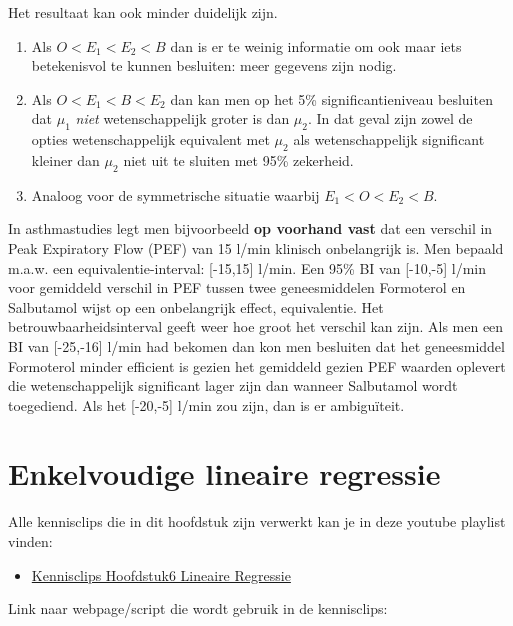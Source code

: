 \documentclass[
  12pt,dutch,coursenotes]{book}
\providecommand{\tightlist}{%
  \setlength{\itemsep}{0pt}\setlength{\parskip}{0pt}}
\theoremstyle{definition}
\theoremstyle{definition}
\theoremstyle{definition}
\theoremstyle{definition}
\theoremstyle{remark}
\begin{document}
Het resultaat kan ook minder duidelijk zijn.

\begin{enumerate}
\def\labelenumi{\arabic{enumi}.}
\tightlist
\item
  Als \(O < E_1 < E_2 < B\) dan is er te weinig informatie om ook maar iets betekenisvol te kunnen besluiten: meer gegevens zijn nodig.
\item
  Als \(O < E_1 < B < E_2\) dan kan men op het 5\% significantieniveau besluiten dat \(\mu_1\) \emph{niet} wetenschappelijk groter is dan \(\mu_2\). In dat geval zijn zowel de opties wetenschappelijk equivalent met \(\mu_2\) als wetenschappelijk significant kleiner dan \(\mu_2\) niet uit te sluiten met 95\% zekerheid.
\item
  Analoog voor de symmetrische situatie waarbij \(E_1 < O < E_2 < B.\)
\end{enumerate}

In asthmastudies legt men bijvoorbeeld \textbf{op voorhand vast} dat een verschil in Peak Expiratory Flow (PEF) van 15 l/min klinisch onbelangrijk is. Men bepaald m.a.w. een equivalentie-interval: {[}-15,15{]} l/min. Een 95\% BI van {[}-10,-5{]} l/min voor gemiddeld verschil in PEF tussen twee geneesmiddelen Formoterol en Salbutamol wijst op een onbelangrijk effect, equivalentie. Het betrouwbaarheidsinterval geeft weer hoe groot het verschil kan zijn.
Als men een BI van {[}-25,-16{]} l/min had bekomen dan kon men besluiten dat het geneesmiddel Formoterol minder efficient is gezien het gemiddeld gezien PEF waarden oplevert die wetenschappelijk significant lager zijn dan wanneer Salbutamol wordt toegediend. Als het {[}-20,-5{]} l/min zou zijn, dan is er ambiguïteit.

\hypertarget{chap-linReg}{%
\chapter{Enkelvoudige lineaire regressie}\label{chap-linReg}}

Alle kennisclips die in dit hoofdstuk zijn verwerkt kan je in deze youtube playlist vinden:

\begin{itemize}
\tightlist
\item
  \href{https://www.youtube.com/playlist?list=PLZH1hP8_LbJJyNBiMlv24sSI0oKB8EtI0}{Kennisclips Hoofdstuk6 Lineaire Regressie}
\end{itemize}

Link naar webpage/script die wordt gebruik in de kennisclips:
\end{document}
